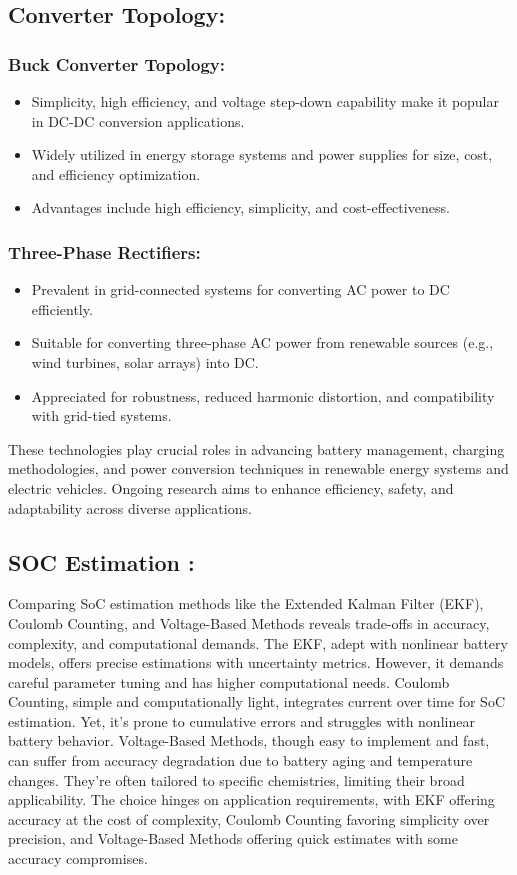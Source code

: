 \documentclass[conference]{IEEEtran}
\begin{document}
\subsection{Converter Topology: }
\subsubsection{Buck Converter Topology:}
\begin{itemize}
  \item Simplicity, high efficiency, and voltage step-down capability make it popular in DC-DC conversion applications.
  \item Widely utilized in energy storage systems and power supplies for size, cost, and efficiency optimization.
  \item Advantages include high efficiency, simplicity, and cost-effectiveness.
\end{itemize}

\subsubsection{Three-Phase Rectifiers:}
\begin{itemize}
  \item Prevalent in grid-connected systems for converting AC power to DC efficiently.
  \item Suitable for converting three-phase AC power from renewable sources (e.g., wind turbines, solar arrays) into DC.
  \item Appreciated for robustness, reduced harmonic distortion, and compatibility with grid-tied systems.
\end{itemize}

These technologies play crucial roles in advancing battery management, charging methodologies, and power conversion techniques in renewable energy systems and electric vehicles. Ongoing research aims to enhance efficiency, safety, and adaptability across diverse applications.

\subsection{SOC Estimation :}
\hspace{0.5cm}Comparing SoC estimation methods like the Extended Kalman Filter (EKF), Coulomb Counting, and Voltage-Based Methods reveals trade-offs in accuracy, complexity, and computational demands.
The EKF, adept with nonlinear battery models, offers precise estimations with uncertainty metrics. However, it demands careful parameter tuning and has higher computational needs.
Coulomb Counting, simple and computationally light, integrates current over time for SoC estimation. Yet, it's prone to cumulative errors and struggles with nonlinear battery behavior.
Voltage-Based Methods, though easy to implement and fast, can suffer from accuracy degradation due to battery aging and temperature changes. They're often tailored to specific chemistries, limiting their broad applicability.
The choice hinges on application requirements, with EKF offering accuracy at the cost of complexity, Coulomb Counting favoring simplicity over precision, and Voltage-Based Methods offering quick estimates with some accuracy compromises.
\end{document}
